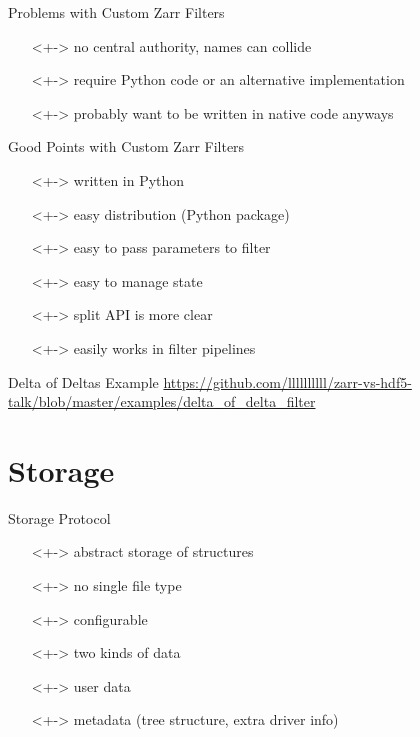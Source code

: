 \documentclass{beamer}
\begin{document}
\begin{frame}{Problems with Custom Zarr Filters}
  \begin{itemize}
  \item[]<+-> no central authority, names can collide
  \item[]<+-> require Python code or an alternative implementation
  \item[]<+-> probably want to be written in native code anyways
  \end{itemize}
\end{frame}

\begin{frame}{Good Points with Custom Zarr Filters}
  \begin{itemize}
  \item[]<+-> written in Python
  \item[]<+-> easy distribution (Python package)
  \item[]<+-> easy to pass parameters to filter
  \item[]<+-> easy to manage state
  \item[]<+-> split API is more clear
  \item[]<+-> easily works in filter pipelines
  \end{itemize}
\end{frame}

\begin{frame}{Delta of Deltas Example}
  \url{https://github.com/llllllllll/zarr-vs-hdf5-talk/blob/master/examples/delta_of_delta_filter}
\end{frame}

\section{Storage}

\begin{frame}{Storage Protocol}
  \begin{itemize}
  \item[]<+-> abstract storage of structures
  \item[]<+-> no single file type
  \item[]<+-> configurable
  \item[]<+-> two kinds of data
  \item[]<+-> user data
  \item[]<+-> metadata (tree structure, extra driver info)
  \end{itemize}
\end{frame}
\end{document}
